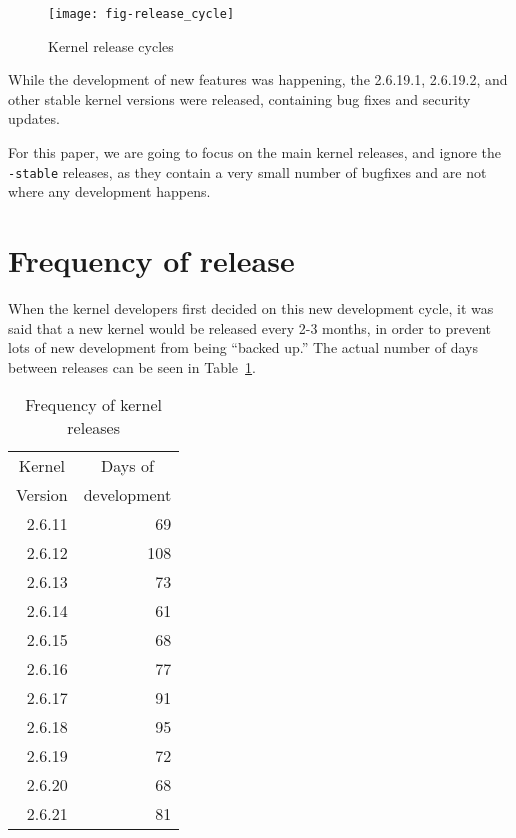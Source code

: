 \documentclass[final]{ols}
\begin{document}
\begin{figure}[thb]
\begin{center}
\texttt{[image: fig-release\_cycle]}
\caption{Kernel release cycles}
\label{gkh-release-cycle}
\end{center}
\end{figure}

While the development of new features was happening, the 2.6.19.1,
2.6.19.2, and other stable kernel versions were released, containing bug
fixes and security updates.

For this paper, we are going to focus on the main kernel releases, and
ignore the \texttt{-stable} releases, as they contain a very small number of
bugfixes and are not where any development happens.

\section{Frequency of release}
When the kernel developers first decided on this new development cycle,
it was said that a new kernel would be released every 2-3 months, in
order to prevent lots of new development from being ``backed up.''
The actual number of days between releases can be seen in Table~\ref{gkh-days}.

\begin{table}[tbph]
\begin{center}
\begin{tabular}{|r|r|}
\hline
\multicolumn{1}{|c|}{Kernel} & \multicolumn{1}{|c|}{Days of}\\
\multicolumn{1}{|c|}{Version} & \multicolumn{1}{|c|}{development}\\
\hline
\hline
2.6.11	& 69	\\
2.6.12	& 108	\\
2.6.13	& 73	\\
2.6.14	& 61	\\
2.6.15	& 68	\\
2.6.16	& 77	\\
2.6.17	& 91	\\
2.6.18	& 95	\\
2.6.19	& 72	\\
2.6.20	& 68	\\
2.6.21	& 81	\\
\hline
\end{tabular}
\caption{Frequency of kernel releases}
\label{gkh-days}
\end{center}
\end{table}
\end{document}
